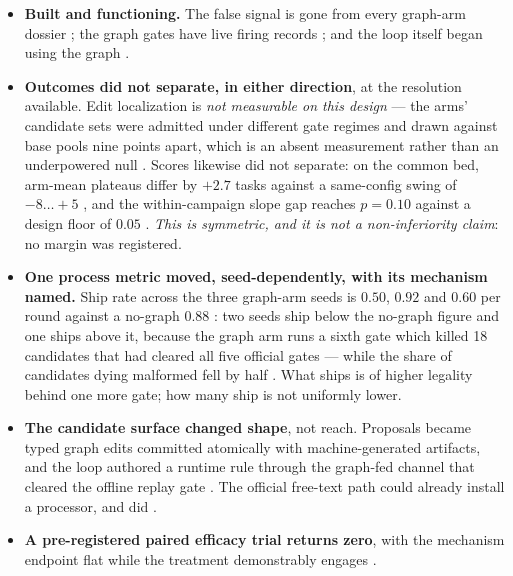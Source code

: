 \begin{itemize}
  \item \textbf{Built and functioning.} The false signal is gone from every
        graph-arm dossier ; the graph gates have live firing records
        ; and the loop itself began using the graph .
  \item \textbf{Outcomes did not separate, in either direction}, at the
        resolution available. Edit localization is \emph{not measurable on
        this design} --- the arms' candidate sets were admitted under
        different gate regimes and drawn against base pools nine points
        apart, which is an absent measurement rather than an underpowered
        null . Scores likewise did not separate: on the common
        bed, arm-mean plateaus differ by $+2.7$ tasks against a same-config
        swing of $-8\ldots{+}5$ , and the within-campaign slope gap
        reaches $p = 0.10$ against a design floor of $0.05$ .
        \emph{This is symmetric, and it is not a non-inferiority claim}: no
        margin was registered.
  \item \textbf{One process metric moved, seed-dependently, with its
        mechanism named.} Ship rate across the three graph-arm seeds is
        $0.50$, $0.92$ and $0.60$ per round against a no-graph $0.88$
        : two seeds ship below the no-graph figure and one ships
        above it, because the graph arm runs a sixth gate which killed 18
        candidates that had cleared all five official gates --- while the
        share of candidates dying malformed fell by half . What
        ships is of higher legality behind one more gate; how many ship
        is not uniformly lower.
  \item \textbf{The candidate surface changed shape}, not reach. Proposals
        became typed graph edits committed atomically with machine-generated
        artifacts, and the loop authored a runtime rule through the
        graph-fed channel that cleared the offline replay gate .
        The official free-text path could already install a processor, and
        did .
  \item \textbf{A pre-registered paired efficacy trial returns zero}, with
        the mechanism endpoint flat while the treatment demonstrably
        engages .
\end{itemize}


